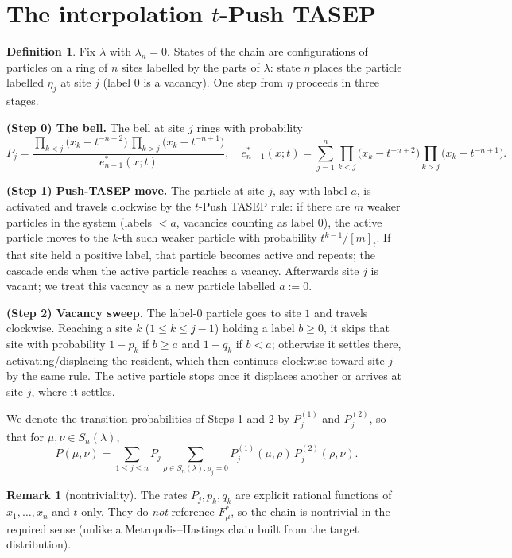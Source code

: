 \documentclass[11pt]{article}
\newcommand{\Snl}{S_n(\lambda)}
\theoremstyle{definition}
\newtheorem{definition}{Definition}
\newtheorem{remark}{Remark}
\begin{document}
\section*{The interpolation $t$-Push TASEP}

\begin{definition}\label{def:chain}
Fix $\lambda$ with $\lambda_n=0$. States of the chain are configurations of
particles on a ring of $n$ sites labelled by the parts of $\lambda$: state $\eta$
places the particle labelled $\eta_j$ at site $j$ (label $0$ is a vacancy). One
step from $\eta$ proceeds in three stages.

\smallskip
\noindent\textbf{(Step 0) The bell.} The bell at site $j$ rings with probability
\[
P_j=\frac{\prod_{k<j}\bigl(x_k-t^{-n+2}\bigr)\,\prod_{k>j}\bigl(x_k-t^{-n+1}\bigr)}
{e^*_{n-1}(x;t)},
\quad
e^*_{n-1}(x;t)=\sum_{j=1}^n\prod_{k<j}\bigl(x_k-t^{-n+2}\bigr)\prod_{k>j}\bigl(x_k-t^{-n+1}\bigr).
\]

\smallskip
\noindent\textbf{(Step 1) Push-TASEP move.} The particle at site $j$, say with
label $a$, is activated and travels clockwise by the $t$-Push TASEP rule: if
there are $m$ weaker particles in the system (labels $<a$, vacancies counting as
label $0$), the active particle moves to the $k$-th such weaker particle with
probability $t^{k-1}/[m]_t$. If that site held a positive label, that particle
becomes active and repeats; the cascade ends when the active particle reaches a
vacancy. Afterwards site $j$ is vacant; we treat this vacancy as a new particle
labelled $a:=0$.

\smallskip
\noindent\textbf{(Step 2) Vacancy sweep.} The label-$0$ particle goes to site $1$
and travels clockwise. Reaching a site $k$ ($1\le k\le j-1$) holding a label
$b\ge0$, it skips that site with probability $1-p_k$ if $b\ge a$ and $1-q_k$ if
$b<a$; otherwise it settles there, activating/displacing the resident, which then
continues clockwise toward site $j$ by the same rule. The active particle stops
once it displaces another or arrives at site $j$, where it settles.
\end{definition}

We denote the transition probabilities of Steps 1 and 2 by $P^{(1)}_j$ and
$P^{(2)}_j$, so that for $\mu,\nu\in\Snl$,
\[
P(\mu,\nu)=\sum_{1\le j\le n}P_j\sum_{\rho\in\Snl:\rho_j=0}
P^{(1)}_j(\mu,\rho)\,P^{(2)}_j(\rho,\nu).
\]

\begin{remark}[nontriviality]
The rates $P_j,p_k,q_k$ are explicit rational functions of $x_1,\dots,x_n$ and
$t$ only. They do \emph{not} reference $F^*_\mu$, so the chain is nontrivial in
the required sense (unlike a Metropolis--Hastings chain built from the target
distribution).
\end{remark}
\end{document}
